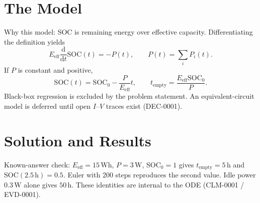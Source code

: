 \documentclass[11pt,letterpaper]{article}
\begin{document}
\section{The Model}
Why this model: SOC is remaining energy over effective capacity.
Differentiating the definition yields
\begin{equation}
E_{\mathrm{eff}}\frac{\mathrm{d}}{\mathrm{d}t}\mathrm{SOC}(t)=-P(t),\qquad
P(t)=\sum_{i}P_i(t).
\end{equation}
If \(P\) is constant and positive,
\begin{equation}
\mathrm{SOC}(t)=\mathrm{SOC}_0-\frac{P}{E_{\mathrm{eff}}}t,\qquad
t_{\mathrm{empty}}=\frac{E_{\mathrm{eff}}\mathrm{SOC}_0}{P}.
\end{equation}
Black-box regression is excluded by the problem statement.
An equivalent-circuit model is deferred until open \(I\)--\(V\) traces exist (DEC-0001).

\section{Solution and Results}
Known-answer check: \(E_{\mathrm{eff}}=15\,\mathrm{Wh}\), \(P=3\,\mathrm{W}\), \(\mathrm{SOC}_0=1\)
gives \(t_{\mathrm{empty}}=5\,\mathrm{h}\) and \(\mathrm{SOC}(2.5\,\mathrm{h})=0.5\).
Euler with 200 steps reproduces the second value.
Idle power \(0.3\,\mathrm{W}\) alone gives \(50\,\mathrm{h}\).
These identities are internal to the ODE (CLM-0001 / EVD-0001).
\end{document}
